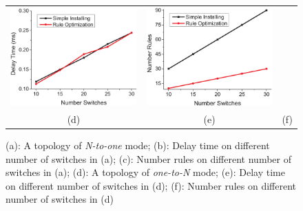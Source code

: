 \documentclass[journal]{IEEEtran}
\begin{document}
\begin{figure} [t]
\begin{center}
{\begin{tabular}{ccc}
\includegraphics[width=0.65\columnwidth]{fig-e-3-24.eps}&\hspace{-0.1\columnwidth}
\includegraphics[width=0.65\columnwidth]{fig-e-4-24.eps} \\
(d) & (e) & (f)
\end{tabular}
}
\caption{(a): A topology of \textit{N-to-one} mode; (b): Delay time on different number of switches in (a); (c): Number rules on different number of switches in (a); (d): A topology of \textit{one-to-N} mode; (e): Delay time on different number of switches in (d); (f): Number rules on different number of switches in (d)} \label{fig9}
  \end{center}
\vspace{-0.3in}
\end{figure}
\end{document}
